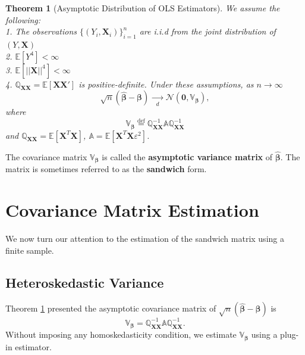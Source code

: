 \documentclass[
]{book}
\newtheorem{theorem}{Theorem}[chapter]
\theoremstyle{definition}
\theoremstyle{definition}
\theoremstyle{definition}
\theoremstyle{definition}
\theoremstyle{remark}
\begin{document}
\begin{theorem}[Asymptotic Distribution of OLS Estimators]
\protect\hypertarget{thm:asympvar}{}\label{thm:asympvar}We assume the following:\\
1. The observations \(\{(Y_i,{\boldsymbol{X}}_i)\}_{i=1}^n\) are i.i.d from the joint
distribution of \((Y,{\boldsymbol{X}})\)\\
2. \({\mathbb{E}\left[ Y^4 \right]}<\infty\)\\
3. \({\mathbb{E}\left[ ||{\boldsymbol{X}}||^4 \right]}<\infty\)\\
4. \({\mathbb{Q}}_{{\boldsymbol{XX}}}={\mathbb{E}\left[ {\boldsymbol{X}}{\boldsymbol{X}}' \right]}\) is positive-definite.
Under these assumptions, as \(n\to\infty\)
\[
\sqrt{n}(\widehat{{\boldsymbol{\beta}}}-{\boldsymbol{\beta}})\xrightarrow[d]{\quad\quad}
\mathcal{N}\left({\boldsymbol{0}},{\mathbb{V}}_{{\boldsymbol{\beta}}}\right),
\]
where
\[{\mathbb{V}}_{{\boldsymbol{\beta}}}\stackrel{\text{def}}{=}{\mathbb{Q}}_{{\boldsymbol{XX}}}^{-1}{\mathbb{A}}{\mathbb{Q}}_{{\boldsymbol{XX}}}^{-1}\]
and \({\mathbb{Q}}_{{\boldsymbol{XX}}}={\mathbb{E}\left[ {\boldsymbol{X}}^T{\boldsymbol{X}} \right]}\), \({\mathbb{A}}={\mathbb{E}\left[ {\boldsymbol{X}}^T{\boldsymbol{X}}\varepsilon^2 \right]}\).
\end{theorem}

The covariance matrix \({\mathbb{V}}_{{\boldsymbol{\beta}}}\) is called the \textbf{asymptotic variance matrix} of \(\widehat{{\boldsymbol{\beta}}}\). The matrix is sometimes referred to as the \textbf{sandwich} form.

\hypertarget{covariance-matrix-estimation}{%
\section{Covariance Matrix Estimation}\label{covariance-matrix-estimation}}

We now turn our attention to the estimation of the sandwich matrix using a finite sample.

\hypertarget{heteroskedastic-variance}{%
\subsection{Heteroskedastic Variance}\label{heteroskedastic-variance}}

Theorem \ref{thm:asympvar} presented the asymptotic covariance matrix of
\(\sqrt{n}(\widehat{{\boldsymbol{\beta}}}-{\boldsymbol{\beta}})\) is
\[{\mathbb{V}}_{{\boldsymbol{\beta}}}
={\mathbb{Q}}_{{\boldsymbol{XX}}}^{-1}{\mathbb{A}}{\mathbb{Q}}_{{\boldsymbol{XX}}}^{-1}.\]
Without imposing any homoskedasticity condition, we estimate \({\mathbb{V}}_{{\boldsymbol{\beta}}}\) using a plug-in estimator.
\end{document}
